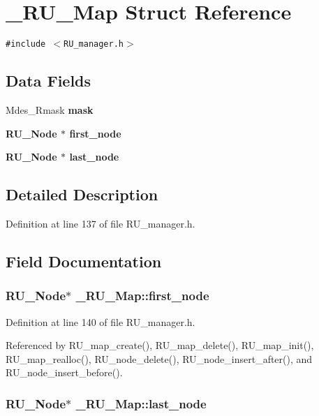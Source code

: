 \section{\_\-RU\_\-Map Struct Reference}
\label{struct__RU__Map}
{\tt \#include $<$RU\_\-manager.h$>$}

\subsection*{Data Fields}
\begin{CompactItemize}
\item 
Mdes\_\-Rmask \bf{mask}
\item 
\bf{RU\_\-Node} $\ast$ \bf{first\_\-node}
\item 
\bf{RU\_\-Node} $\ast$ \bf{last\_\-node}
\end{CompactItemize}


\subsection{Detailed Description}




Definition at line 137 of file RU\_\-manager.h.

\subsection{Field Documentation}
\subsubsection{\setlength{\rightskip}{0pt plus 5cm}\bf{RU\_\-Node}$\ast$ \bf{\_\-RU\_\-Map::first\_\-node}}\label{struct__RU__Map_26a6664a846b703079a8048a263fe1ff}




Definition at line 140 of file RU\_\-manager.h.

Referenced by RU\_\-map\_\-create(), RU\_\-map\_\-delete(), RU\_\-map\_\-init(), RU\_\-map\_\-realloc(), RU\_\-node\_\-delete(), RU\_\-node\_\-insert\_\-after(), and RU\_\-node\_\-insert\_\-before().
\subsubsection{\setlength{\rightskip}{0pt plus 5cm}\bf{RU\_\-Node}$\ast$ \bf{\_\-RU\_\-Map::last\_\-node}}\label{struct__RU__Map_e218d808e2c933e9a9cc2e7a0bb7b47b}




